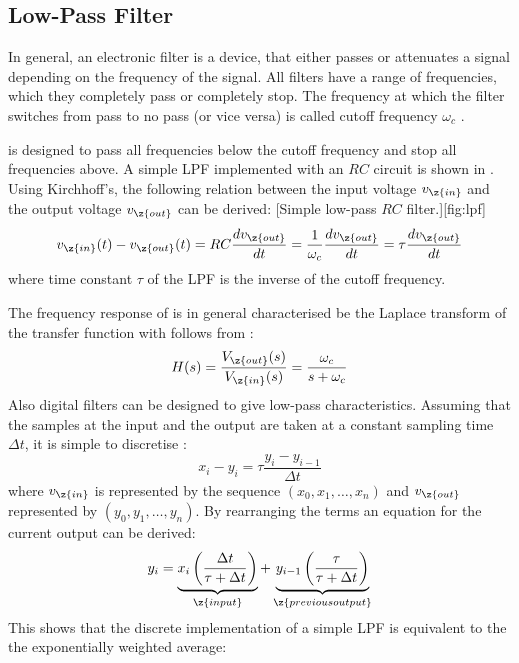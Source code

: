 \subsection{Low-Pass Filter}\label{sec:lfp}
In general, an electronic filter is a device, that either passes or attenuates a signal depending on the frequency of the signal. All filters have a range of frequencies, which they completely pass or completely stop. The frequency at which the filter switches from pass to no pass (or vice versa) is called cutoff frequency $\omega_c$ \cite{filter}.\par 
%
 is designed to pass all frequencies below the cutoff frequency and stop all frequencies above. A simple \ac{LPF} implemented with an $RC$ circuit is shown in . Using Kirchhoff's, the following relation between the input voltage $v_{\z{in}}$ and the output voltage $v_{\z{out}}$ can be derived:
%
[Simple low-pass $RC$ filter.][fig:lpf]
%
\begin{equation}\label{eq:lpf}
  v_{\z{in}}(t) - v_{\z{out}}(t) = RC\dfrac{dv_{\z{out}}}{dt} = \dfrac{1}{\omega_c}\dfrac{dv_{\z{out}}}{dt} = \tau \dfrac{dv_{\z{out}}}{dt}
\end{equation}
%
where time constant $\tau$ of the \ac{LPF} is the inverse of the cutoff frequency.\par
%
The frequency response of  is in general characterised be the Laplace transform of the transfer function with follows from :
%
\begin{equation}
  H(s) = \dfrac{V_{\z{out}}(s)}{V_{\z{in}}(s)} = \dfrac{\omega_c}{s + \omega_c}
\end{equation}
%
Also digital filters can be designed to give low-pass characteristics. Assuming that the samples at the input and the output are taken at a constant sampling time $\Delta t$, it is simple to discretise : 
%
\begin{equation}
  x_i - y_i = \tau\dfrac{y_i - y_{i-1}}{\Delta t}
\end{equation}
%
where $v_{\z{in}}$ is represented by the sequence $(x_0, x_1, \ldots, x_n)$ and $v_{\z{out}}$ represented by $(y_0, y_1, \ldots, y_n)$. By rearranging the terms an equation for the current output can be derived:
%
\begin{equation}
  y_i = \underbrace{x_i\left(\dfrac{\Delta t}{\tau + \Delta t}\right)}_{\z{input}} + \underbrace{y_{i-1}\left(\dfrac{\tau}{\tau + \Delta t}\right)}_{\z{previous output}}
\end{equation}
%
This shows that the discrete implementation of a simple \ac{LPF} is equivalent to the the exponentially weighted average:
